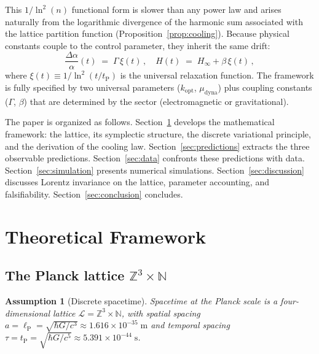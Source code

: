 \documentclass[twocolumn,showpacs,preprintnumbers,amsmath,amssymb,prd]{revtex4-2}
\newtheorem{assumption}{Assumption}
\newcommand{\lnq}{\ln^2}
\newcommand{\tP}{t_{\mathrm{P}}}
\newcommand{\lP}{\ell_{\mathrm{P}}}
\newcommand{\Hinf}{H_{\infty}}
\newcommand{\ZZ}{\mathbb{Z}}
\newcommand{\NN}{\mathbb{N}}
\begin{document}
This $1/\lnq(n)$ functional form is slower than any power law and
arises naturally from the logarithmic divergence of the harmonic
sum associated with the lattice partition function
(Proposition~\ref{prop:cooling}).
Because physical constants couple to the control parameter, they
inherit the same drift:
\begin{equation}
  \frac{\Delta\alpha}{\alpha}(t) \;=\; \Gamma\,\xi(t)\,,
  \quad
  H(t) \;=\; \Hinf + \beta\,\xi(t)\,,
  \label{eq:observables}
\end{equation}
where $\xi(t) \equiv 1/\lnq(t/\tP)$ is the universal relaxation
function.
The framework is fully specified by two universal parameters
($k_{\mathrm{opt}}$, $\mu_{\mathrm{dyna}}$) plus coupling
constants ($\Gamma$, $\beta$) that are determined by the sector
(electromagnetic or gravitational).

The paper is organized as follows.
Section~\ref{sec:framework} develops the mathematical framework:
the lattice, its symplectic structure, the discrete variational
principle, and the derivation of the cooling law.
Section~\ref{sec:predictions} extracts the three observable
predictions.
Section~\ref{sec:data} confronts these predictions with data.
Section~\ref{sec:simulation} presents numerical simulations.
Section~\ref{sec:discussion} discusses Lorentz invariance on the
lattice, parameter accounting, and falsifiability.
Section~\ref{sec:conclusion} concludes.

\section{Theoretical Framework}\label{sec:framework}

\subsection{The Planck lattice $\ZZ^3 \times \NN$}
\label{sec:lattice}

\begin{assumption}[Discrete spacetime]\label{ass:discrete}
Spacetime at the Planck scale is a four-dimensional lattice
$\mathcal{L} = \ZZ^3 \times \NN$, with spatial spacing
$a = \lP = \sqrt{\hbar G/c^3} \approx 1.616 \times 10^{-35}\;\mathrm{m}$
and temporal spacing $\tau = \tP = \sqrt{\hbar G/c^5}
\approx 5.391 \times 10^{-44}\;\mathrm{s}$.
\end{assumption}
\end{document}

